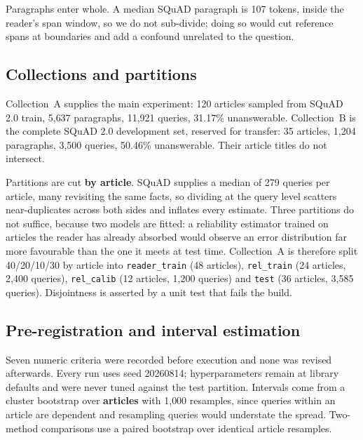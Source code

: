 \documentclass[conference]{IEEEtran}
\begin{document}
Paragraphs enter whole. A median SQuAD paragraph is 107 tokens, inside the reader's
span window, so we do not sub-divide; doing so would cut reference spans at
boundaries and add a confound unrelated to the question.

\subsection{Collections and partitions}
Collection~A supplies the main experiment: 120 articles sampled from SQuAD 2.0
train, 5{,}637 paragraphs, 11{,}921 queries, 31.17\% unanswerable. Collection~B is
the complete SQuAD 2.0 development set, reserved for transfer: 35 articles, 1{,}204
paragraphs, 3{,}500 queries, 50.46\% unanswerable. Their article titles do not
intersect.

Partitions are cut \textbf{by article}. SQuAD supplies a median of 279 queries per
article, many revisiting the same facts, so dividing at the query level scatters
near-duplicates across both sides and inflates every estimate. Three partitions do
not suffice, because two models are fitted: a reliability estimator trained on
articles the reader has already absorbed would observe an error distribution far
more favourable than the one it meets at test time. Collection~A is therefore split
40/20/10/30 by article into \texttt{reader\_train} (48 articles),
\texttt{rel\_train} (24 articles, 2{,}400 queries), \texttt{rel\_calib} (12
articles, 1{,}200 queries) and \texttt{test} (36 articles, 3{,}585 queries).
Disjointness is asserted by a unit test that fails the build.

\subsection{Pre-registration and interval estimation}
Seven numeric criteria were recorded before execution and none was revised
afterwards. Every run uses seed 20260814; hyperparameters remain at library
defaults and were never tuned against the test partition. Intervals come from a
cluster bootstrap over \textbf{articles} with 1{,}000 resamples, since queries
within an article are dependent and resampling queries would understate the spread.
Two-method comparisons use a paired bootstrap over identical article resamples.
\end{document}
